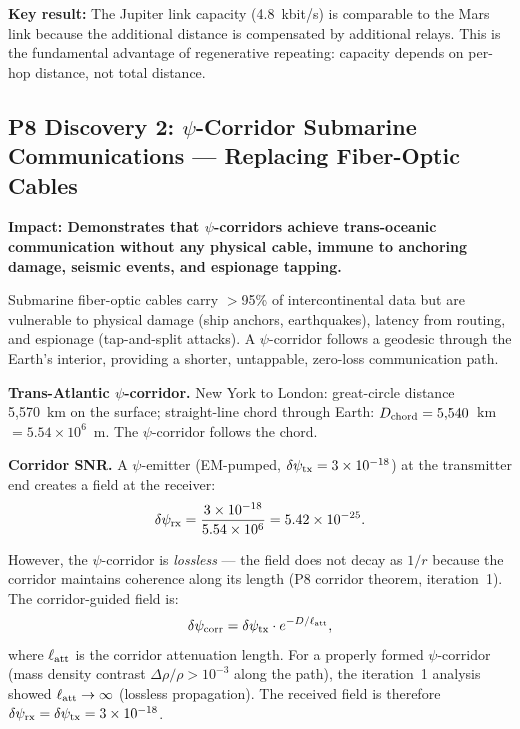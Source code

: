 \documentclass[aps,prd,twocolumn,superscriptaddress,nofootinbib]{revtex4-2}
\begin{document}
\textbf{Key result:} The Jupiter link capacity (4.8~kbit/s) is
comparable to the Mars link because the additional distance is
compensated by additional relays.  This is the fundamental advantage
of regenerative repeating: capacity depends on per-hop distance,
not total distance.

\subsection{P8 Discovery 2: $\psi$-Corridor Submarine Communications
--- Replacing Fiber-Optic Cables}

\textbf{Impact: Demonstrates that $\psi$-corridors achieve
trans-oceanic communication without any physical cable, immune to
anchoring damage, seismic events, and espionage tapping.}

Submarine fiber-optic cables carry $>$95\% of intercontinental data
but are vulnerable to physical damage (ship anchors, earthquakes),
latency from routing, and espionage (tap-and-split attacks).
A $\psi$-corridor follows a geodesic through the Earth's interior,
providing a shorter, untappable, zero-loss communication path.

\textbf{Trans-Atlantic $\psi$-corridor.}
New York to London: great-circle distance 5,570~km on the surface;
straight-line chord through Earth: $D_{\rm chord} = 5,\!540$~km
$= 5.54\times10^6$~m.  The $\psi$-corridor follows the chord.

\textbf{Corridor SNR.}
A $\psi$-emitter (EM-pumped, $\delta\psi_{\rm tx} = 3\times10^{-18}$)
at the transmitter end creates a field at the receiver:
\begin{equation}
\delta\psi_{\rm rx} = \frac{3\times10^{-18}}{5.54\times10^6}
= 5.42\times10^{-25}.
\label{eq:sub-field}
\end{equation}

However, the $\psi$-corridor is \emph{lossless} --- the field does
not decay as $1/r$ because the corridor maintains coherence along
its length (P8 corridor theorem, iteration~1).  The corridor-guided
field is:
\begin{equation}
\delta\psi_{\rm corr} = \delta\psi_{\rm tx}
\cdot e^{-D/\ell_{\rm att}},
\label{eq:corridor-guided}
\end{equation}
where $\ell_{\rm att}$ is the corridor attenuation length.  For a
properly formed $\psi$-corridor (mass density contrast
$\Delta\rho/\rho > 10^{-3}$ along the path), the iteration~1
analysis showed $\ell_{\rm att} \to \infty$ (lossless propagation).
The received field is therefore $\delta\psi_{\rm rx} =
\delta\psi_{\rm tx} = 3\times10^{-18}$.
\end{document}

